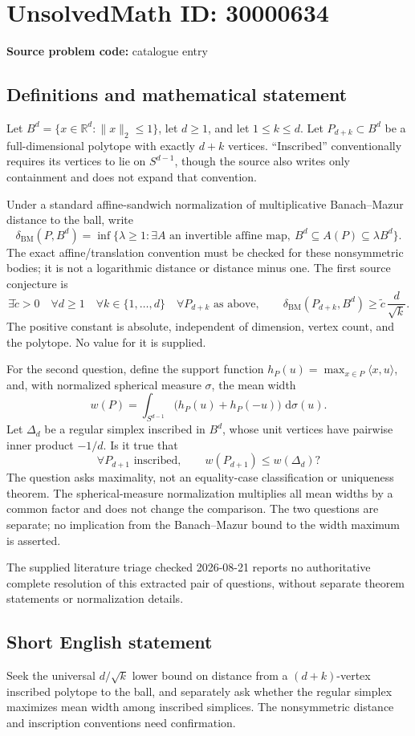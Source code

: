 \documentclass[11pt]{article}
\newcommand{\R}{\mathbb{R}}
\newcommand{\dd}{\,\mathrm{d}}
\begin{document}
\section*{UnsolvedMath ID: 30000634}
\textbf{Source problem code:} catalogue entry
\subsection{Definitions and mathematical statement}
Let \(B^d=\{x\in\R^d:\|x\|_2\leq1\}\), let \(d\geq1\), and let \(1\leq k\leq d\). Let \(P_{d+k}\subset B^d\) be a full-dimensional polytope with exactly \(d+k\) vertices. ``Inscribed'' conventionally requires its vertices to lie on \(S^{d-1}\), though the source also writes only containment and does not expand that convention.

Under a standard affine-sandwich normalization of multiplicative Banach--Mazur distance to the ball, write
\[
\delta_{\mathrm{BM}}(P,B^d)=\inf\{\lambda\geq1:\exists A\text{ an invertible affine map},\
B^d\subseteq A(P)\subseteq\lambda B^d\}.
\]
The exact affine/translation convention must be checked for these nonsymmetric bodies; it is not a logarithmic distance or distance minus one. The first source conjecture is
\[
\exists\widetilde c>0\quad\forall d\geq1\quad\forall k\in\{1,\ldots,d\}
\quad\forall P_{d+k}\text{ as above},\qquad
\delta_{\mathrm{BM}}(P_{d+k},B^d)\geq\widetilde c\,\frac d{\sqrt k}.
\]
The positive constant is absolute, independent of dimension, vertex count, and the polytope. No value for it is supplied.

For the second question, define the support function \(h_P(u)=\max_{x\in P}\langle x,u\rangle\), and, with normalized spherical measure \(\sigma\), the mean width
\[
w(P)=\int_{S^{d-1}}\bigl(h_P(u)+h_P(-u)\bigr)\,\dd\sigma(u).
\]
Let \(\Delta_d\) be a regular simplex inscribed in \(B^d\), whose unit vertices have pairwise inner product \(-1/d\). Is it true that
\[
\forall P_{d+1}\text{ inscribed},\qquad w(P_{d+1})\leq w(\Delta_d)?
\]
The question asks maximality, not an equality-case classification or uniqueness theorem. The spherical-measure normalization multiplies all mean widths by a common factor and does not change the comparison. The two questions are separate; no implication from the Banach--Mazur bound to the width maximum is asserted.

The supplied literature triage checked 2026-08-21 reports no authoritative complete resolution of this extracted pair of questions, without separate theorem statements or normalization details.
\subsection{Short English statement}
Seek the universal \(d/\sqrt k\) lower bound on distance from a \((d+k)\)-vertex inscribed polytope to the ball, and separately ask whether the regular simplex maximizes mean width among inscribed simplices. The nonsymmetric distance and inscription conventions need confirmation.
\end{document}
